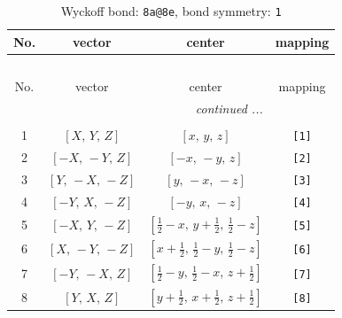 \documentclass[fleqn,8pt]{jsarticle}
\begin{document}
\begin{longtable}{cccc}
\caption{Wyckoff bond: {\tt 8a@8e}, bond symmetry: {\tt 1}}
 \\
 \hline \hline
No. & vector & center & mapping \\ \hline \endfirsthead

\multicolumn{3}{l}{\tablename\ \thetable{}} \\
 \hline \hline
No. & vector & center & mapping \\ \hline \endhead

 \hline \hline
\multicolumn{3}{r}{\footnotesize\it continued ...} \\ \endfoot

 \hline \hline
\multicolumn{3}{r}{} \\ \endlastfoot

1 & $\left[ X,\, Y,\, Z \right]$ & $\left[ x,\, y,\, z \right]$ & {\tt [1]} \\ \hline
2 & $\left[ - X,\, - Y,\, Z \right]$ & $\left[ - x,\, - y,\, z \right]$ & {\tt [2]} \\ \hline
3 & $\left[ Y,\, - X,\, - Z \right]$ & $\left[ y,\, - x,\, - z \right]$ & {\tt [3]} \\ \hline
4 & $\left[ - Y,\, X,\, - Z \right]$ & $\left[ - y,\, x,\, - z \right]$ & {\tt [4]} \\ \hline
5 & $\left[ - X,\, Y,\, - Z \right]$ & $\left[ \frac{1}{2} - x,\, y + \frac{1}{2},\, \frac{1}{2} - z \right]$ & {\tt [5]} \\ \hline
6 & $\left[ X,\, - Y,\, - Z \right]$ & $\left[ x + \frac{1}{2},\, \frac{1}{2} - y,\, \frac{1}{2} - z \right]$ & {\tt [6]} \\ \hline
7 & $\left[ - Y,\, - X,\, Z \right]$ & $\left[ \frac{1}{2} - y,\, \frac{1}{2} - x,\, z + \frac{1}{2} \right]$ & {\tt [7]} \\ \hline
8 & $\left[ Y,\, X,\, Z \right]$ & $\left[ y + \frac{1}{2},\, x + \frac{1}{2},\, z + \frac{1}{2} \right]$ & {\tt [8]} \\
\end{longtable}
\end{document}
